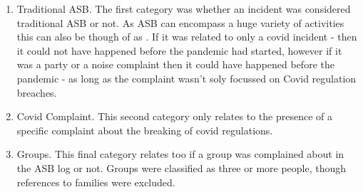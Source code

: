 \begin{enumerate}
\item{Traditional ASB.} The first category was whether an incident was considered traditional ASB or not. As ASB can encompass a huge variety of activities this can also be though of as . If it was related to only a covid incident - then it could not have happened before the pandemic had started, however if it was a party or a noise complaint then it could have happened before the pandemic - as long as the complaint wasn't soly focussed on Covid regulation breaches.
\item{Covid Complaint.} This second category only relates to the presence of a specific complaint about the breaking of covid regulations.
\item{Groups.} This final category relates too if a group was complained about in the ASB log or not. Groups were classified as three or more people, though references to families were excluded.

\end{enumerate}

